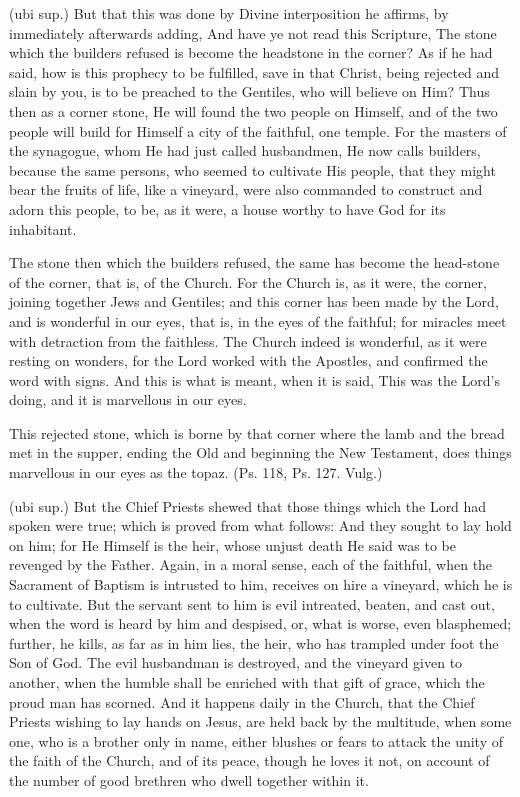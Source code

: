  (ubi sup.) But that this was done by Divine interposition he affirms, by immediately afterwards adding, And have ye not read this Scripture, The stone which the builders refused is become the headstone in the corner? As if he had said, how is this prophecy to be fulfilled, save in that Christ, being rejected and slain by you, is to be preached to the Gentiles, who will believe on Him? Thus then as a corner stone, He will found the two people on Himself, and of the two people will build for Himself a city of the faithful, one temple. For the masters of the synagogue, whom He had just called husbandmen, He now calls builders, because the same persons, who seemed to cultivate His people, that they might bear the fruits of life, like a vineyard, were also commanded to construct and adorn this people, to be, as it were, a house worthy to have God for its inhabitant.

 The stone then which the builders refused, the same has become the head-stone of the corner, that is, of the Church. For the Church is, as it were, the corner, joining together Jews and Gentiles; and this corner has been made by the Lord, and is wonderful in our eyes, that is, in the eyes of the faithful; for miracles meet with detraction from the faithless. The Church indeed is wonderful, as it were resting on wonders, for the Lord worked with the Apostles, and confirmed the word with signs. And this is what is meant, when it is said, This was the Lord’s doing, and it is marvellous in our eyes.

 This rejected stone, which is borne by that corner where the lamb and the bread met in the supper, ending the Old and beginning the New Testament, does things marvellous in our eyes as the topaz. (Ps. 118, Ps. 127. Vulg.)

 (ubi sup.) But the Chief Priests shewed that those things which the Lord had spoken were true; which is proved from what follows: And they sought to lay hold on him; for He Himself is the heir, whose unjust death He said was to be revenged by the Father. Again, in a moral sense, each of the faithful, when the Sacrament of Baptism is intrusted to him, receives on hire a vineyard, which he is to cultivate. But the servant sent to him is evil intreated, beaten, and cast out, when the word is heard by him and despised, or, what is worse, even blasphemed; further, he kills, as far as in him lies, the heir, who has trampled under foot the Son of God. The evil husbandman is destroyed, and the vineyard given to another, when the humble shall be enriched with that gift of grace, which the proud man has scorned. And it happens daily in the Church, that the Chief Priests wishing to lay hands on Jesus, are held back by the multitude, when some one, who is a brother only in name, either blushes or fears to attack the unity of the faith of the Church, and of its peace, though he loves it not, on account of the number of good brethren who dwell together within it.

